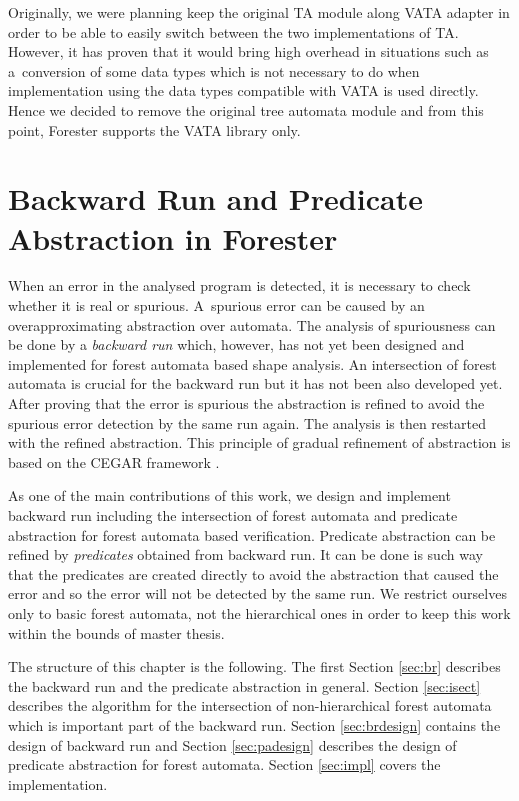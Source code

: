 Originally, we were planning keep the original TA module along VATA adapter
in order to be able to easily switch between the two implementations of TA.
However, it has proven that it would bring high overhead in situations such as
a~conversion of some data types which is not necessary to do
when implementation using the data types compatible
with VATA is used directly.
Hence we decided to remove the original tree automata module and
from this point, Forester supports the VATA library only.

\chapter{Backward Run and Predicate Abstraction in Forester}
\label{ch:backward}

When an error in the analysed program is detected,
it is necessary to check whether it is real or spurious.
A~spurious error can be caused by an overapproximating abstraction over automata.
The analysis of spuriousness can be done by a \emph{backward run} which, however, has not
yet been designed and implemented for forest automata based shape analysis.
An intersection of forest automata is crucial for the backward run but it has not
been also developed yet.
After proving that the error is spurious the abstraction is refined to avoid
the spurious error detection by the same run again.
The analysis is then restarted with the refined abstraction.
This principle of gradual refinement of abstraction is based on the CEGAR framework \cite{cegar}.

As one of the main contributions of this work,
we design and implement backward run including the intersection of forest automata
and predicate abstraction \cite{artmc} for forest automata based verification.
Predicate abstraction can be refined by \emph{predicates} obtained from backward run.
It can be done is such way that the predicates are created directly
to avoid the abstraction that caused the error and so the error will not be detected by the same run.
We restrict ourselves only to basic forest automata, not the hierarchical ones
in order to keep this work within the bounds of master thesis.

The structure of this chapter is the following.
The first Section \ref{sec:br} describes the backward run and the predicate abstraction in general.
Section \ref{sec:isect} describes the algorithm for the intersection of non-hierarchical forest automata
which is important part of the backward run.
Section \ref{sec:brdesign} contains the design of backward run
and Section \ref{sec:padesign} describes the design of predicate abstraction for forest automata.
Section \ref{sec:impl} covers the implementation.

